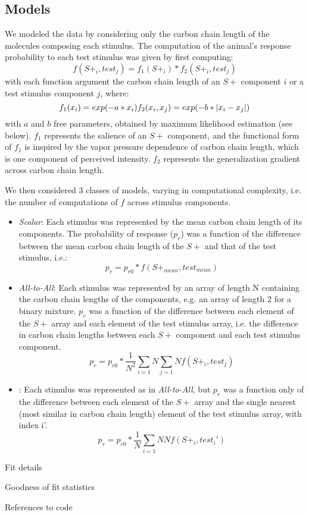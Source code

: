 \subsection*{Models}
\label{sec:methods_models}

We modeled the data by considering only the carbon chain length of the molecules composing each stimulus.  
The computation of the animal's response probability to each test stimulus was given by first computing: 
\begin{equation}
f(S+_i,test_j) = f_1(S+_i) * f_2(S+_i,test_j)
\end{equation}
with each function argument the carbon chain length of an $S+$ component $i$ or a test stimulus component $j$, where:
\begin{equation}
f_1(x_i) = exp(-a*x_i) \\
f_2(x_i,x_j) = exp(-b*|x_i-x_j|)
\end{equation}
with $a$ and $b$ free parameters, obtained by maximum likelihood estimation (see below).  
$f_1$ represents the salience of an $S+$ component, and the functional form of $f_1$ is inspired by the vapor pressure dependence of carbon chain length, which is one component of perceived intensity.  $f_2$ represents the generalization gradient across carbon chain length.  

We then considered 3 classes of models, varying in computational complexity, i.e. the number of computations of $f$ across stimulus components.  
\begin{itemize}
\item \textit{Scalar}: Each stimulus was represented by the mean carbon chain length of its components.  The probability of response ($p_r$) was a function of the difference between the mean carbon chain length of the $S+$ and that of the test stimulus, i.e.:
\begin{equation}
p_r = p_{r0} * f(S+_{mean},test_{mean})
\end{equation}
\item \textit{All-to-All}: Each stimulus was represented by an array of length N containing the carbon chain lengths of the components, e.g. an array of length 2 for a binary mixture. $p_r$ was a function of the difference between each element of the $S+$ array and each element of the test stimulus array, i.e. the difference in carbon chain lengths between each $S+$ component and each test stimulus component.  
\begin{equation}
p_r = p_{r0} * \frac{1}{N^2}\sum_{i=1}{N}\sum_{j=1}{N}f(S+_i,test_j)
\end{equation}
\item {}: Each stimulus was represented as in \textit{All-to-All}, but $p_r$ was a function only of the difference between each element of the $S+$ array and the single nearest (most similar in carbon chain length) element of the test stimulus array, with index i'.  
\begin{equation}
p_r = p_{r0} * \frac{1}{N}\sum_{i=1}{N}{N}f(S+_i,test_i')
\end{equation}
\end{itemize}

\item Fit details
\item Goodness of fit statistics
\item References to code
